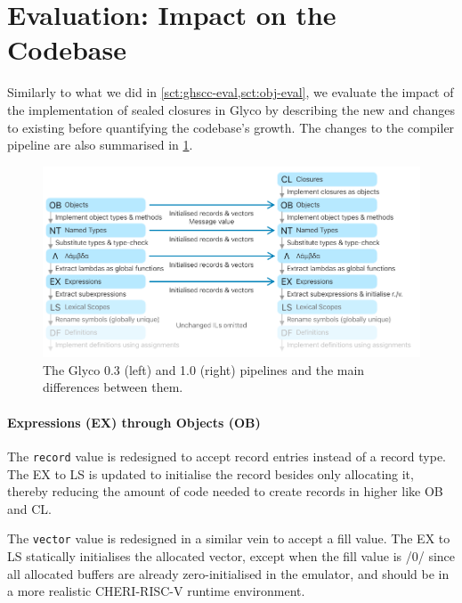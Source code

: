 \documentclass[main.tex]{subfiles}
\begin{document}
\section{Evaluation: Impact on the Codebase} \label{sct:cls-eval}
Similarly to what we did in \cref{sct:ghscc-eval,sct:obj-eval}, we evaluate the impact of the implementation of sealed closures in Glyco by describing the new  and changes to existing  before quantifying the codebase's growth. The changes to the compiler pipeline are also summarised in \cref{fig:pipeline10}.

\begin{figure}
	\centering
	\includegraphics{Images/Pipeline v1.0.pdf}
	\caption{The Glyco 0.3 (left) and 1.0 (right) pipelines and the main differences between them.}
	\label{fig:pipeline10}
\end{figure}

\paragraph{Expressions (EX) through Objects (OB)} The \texttt{record} value is redesigned to accept record entries instead of a record type. The EX to LS  is updated to initialise the record besides only allocating it, thereby reducing the amount of code needed to create records in higher  like OB and CL.

The \texttt{vector} value is redesigned in a similar vein to accept a fill value. The EX to LS  statically initialises the allocated vector, except when the fill value is \iil/0/ since all allocated buffers are already zero-initialised in the emulator, and should be in a more realistic CHERI-RISC-V runtime environment.
\end{document}
